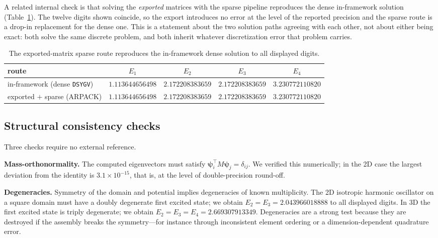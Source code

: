 \documentclass[pdflatex,sn-mathphys-num]{sn-jnl}
\theoremstyle{thmstyleone}%
\theoremstyle{thmstyletwo}%
\theoremstyle{thmstylethree}%
\begin{document}
A related internal check is that solving the \emph{exported} matrices with the
sparse pipeline reproduces the dense in-framework solution (Table~\ref{tab:export}).
The twelve digits shown coincide, so the export introduces no error at the level
of the reported precision and the sparse route is a drop-in replacement for the
dense one. This is a statement about the two solution paths agreeing with each
other, not about either being exact: both solve the same discrete problem, and
both inherit whatever discretization error that problem carries.

\begin{table}[t]
\caption{The exported-matrix sparse route reproduces the in-framework dense
solution to all displayed digits.}\label{tab:export}
\begin{tabular}{@{}lcccc@{}}
\toprule
route & $E_1$ & $E_2$ & $E_3$ & $E_4$ \\
\midrule
in-framework (dense \texttt{DSYGV}) & $1.113644656498$ & $2.172208383659$ & $2.172208383659$ & $3.230772110820$ \\
exported $+$ sparse (ARPACK) & $1.113644656498$ & $2.172208383659$ & $2.172208383659$ & $3.230772110820$ \\
\bottomrule
\end{tabular}
\end{table}

\subsection{Structural consistency checks}\label{sec:structural}

Three checks require no external reference.

\textbf{Mass-orthonormality.} The computed eigenvectors must satisfy
$\boldsymbol{\psi}_i^\top M \boldsymbol{\psi}_j = \delta_{ij}$. We verified this
numerically; in the 2D case the largest deviation from the identity is
$3.1\times10^{-15}$, that is, at the level of double-precision round-off.

\textbf{Degeneracies.} Symmetry of the domain and potential implies degeneracies
of known multiplicity. The 2D isotropic harmonic oscillator on a square domain
must have a doubly degenerate first excited state; we obtain
$E_2 = E_3 = 2.043966018888$ to all displayed digits. In 3D the first excited
state is triply degenerate; we obtain $E_2 = E_3 = E_4 = 2.669307913349$.
Degeneracies are a strong test because they are destroyed if the assembly breaks
the symmetry---for instance through inconsistent element ordering or a
dimension-dependent quadrature error.
\end{document}
